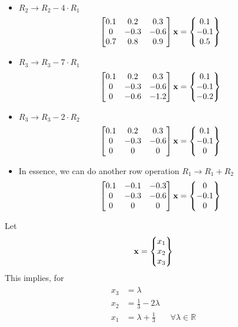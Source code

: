 \documentclass[11pt]{article}
\begin{document}
\begin{itemize}
\item $R_2\rightarrow R_2 - 4 \cdot R_1$
\[
\begin{bmatrix}
0.1 & 0.2 & 0.3\\
0 & -0.3 & -0.6\\
0.7 & 0.8 & 0.9
\end{bmatrix}{\bf x}
= 
\begin{Bmatrix}
0.1\\-0.1\\0.5
\end{Bmatrix}
\]
\item $R_3 \rightarrow R_3 - 7 \cdot R_1$
\[
\begin{bmatrix}
0.1 & 0.2 & 0.3\\
0 & -0.3 & -0.6\\
0 & -0.6 & -1.2
\end{bmatrix}{\bf x}
= 
\begin{Bmatrix}
0.1\\-0.1\\-0.2
\end{Bmatrix}
\]
\item $R_3 \rightarrow R_3-2\cdot R_2$
\[
\begin{bmatrix}
0.1 & 0.2 & 0.3\\
0 & -0.3 & -0.6\\
0 & 0 & 0
\end{bmatrix}{\bf x}
= 
\begin{Bmatrix}
0.1\\-0.1\\0
\end{Bmatrix}
\]
\item In essence, we can do another row operation $R_1 \rightarrow R_1 + R_2$
\[
\begin{bmatrix}
0.1 & -0.1 & -0.3\\
0 & -0.3 & -0.6\\
0 & 0 & 0
\end{bmatrix}{\bf x}
= 
\begin{Bmatrix}
0\\-0.1\\0
\end{Bmatrix}
\]
\end{itemize}
Let 
\[ {\bf x } = 
\begin{Bmatrix}
x_1\\
x_2\\
x_3
\end{Bmatrix}
\]
This implies, for 
\begin{align}
\begin{split}
x_3 &= \lambda \\
x_2 &= \frac{1}{3} - 2\lambda\\
x_1 &= \lambda + \frac{1}{3}  \ \ \ \ \ \ \ \ \forall \lambda \in \mathbb{R}
\end{split}
\end{align}
\end{document}
